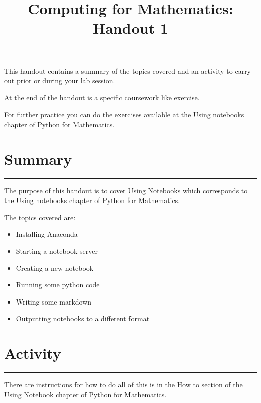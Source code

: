 \documentclass{article}
\title{Computing for Mathematics: Handout 1}
\date{}
\begin{document}
\maketitle


This handout contains a summary of the topics covered and an activity to
carry out prior or during your lab session.

At the end of the handout is a specific coursework like exercise.

For further practice you can do the exercises available at 
\href{https://vknight.org/pfm/tools-for-mathematics/01-using-notebooks/exercises/main.html}{the Using
notebooks chapter of Python for Mathematics}.

\section{Summary}\label{summary}
\hrule


The purpose of this handout is to cover Using Notebooks which
corresponds to the
\href{https://vknight.org/pfm/tools-for-mathematics/01-using-notebooks/introduction/main.html}{Using
notebooks chapter of Python for Mathematics}.

The topics covered are:

\begin{itemize}
\item
  Installing Anaconda
\item
  Starting a notebook server
\item
  Creating a new notebook
\item
  Running some python code
\item
  Writing some markdown
\item
  Outputting notebooks to a different format
\end{itemize}


\section{Activity}\label{activity}
\hrule

There are instructions for how to do all of this is in the
\href{https://vknight.org/pfm/tools-for-mathematics/01-using-notebooks/how/}{How
to section of the Using Notebook chapter of Python for Mathematics}.
\end{document}
